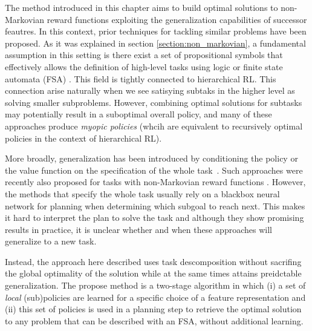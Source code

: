 
The method introduced in this chapter aims to build optimal solutions to non-Markovian reward functions exploiting the generalization capabilities of successor feautres. In this context, prior techniques for tackling similar problems have been proposed. As it was explained in section \ref{section:non_markovian}, a fundamental assumption in this setting is there exist a set of propositional symbols that effectively allows the definition of high-level tasks using logic \citep{ToroIcarte2019, Vaezipoor2021} or finite state automata (FSA) \citep{Icarte2022}. This field is tightly connected to hierarchical RL. This connection arise naturally when we see satisying subtaks in the higher level as solving smaller subproblems.  However, combining optimal solutions for subtasks may potentially result in a suboptimal overall policy, and many of these approaches produce \textit{myopic policies} \citep{Vaezipoor2021} (whcih are equivalent to recursively optimal policies in the context of hierarchical RL).

More broadly, generalization has been introduced by conditioning the policy or the value function on the specification of the whole task~\citep{Schaul2015}. Such approaches were recently also proposed for tasks with non-Markovian reward functions \citep{Vaezipoor2021}. However, the methods that specify the whole task usually rely on a blackbox neural network for planning when determining which subgoal to reach next. This makes it hard to interpret the plan to solve the task and although  they show promising results in practice, %
it is unclear whether and when these approaches will generalize to a new task. 


Instead, the approach here described uses task descomposition without sacrifing the global optimality of the solution while at the same times attains preidctable generalization. The propose method is a two-stage algorithm in which (i) a set of \textit{local} (sub)policies are learned for a specific choice of a feature representation and (ii) this set of policies is used in a planning step to retrieve the optimal solution to any problem that can be described with an FSA, without additional learning.

